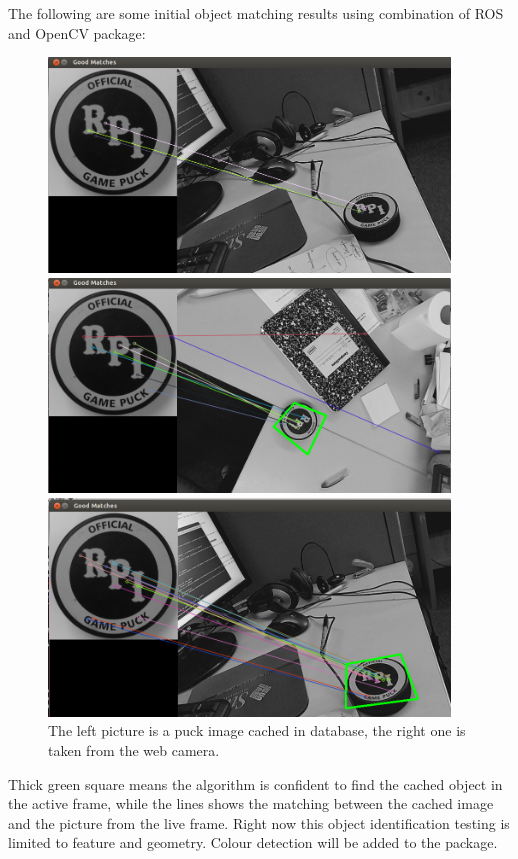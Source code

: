 \documentclass{paper}
\begin{document}
The following are some initial object matching results using combination of ROS and OpenCV package: 
\begin{figure}[htp]
\centering
\includegraphics[width=0.95\textwidth]{fig/vision1.png}  

 
\includegraphics[width=0.95\textwidth]{fig/vision2.png} 

 
\includegraphics[width=0.95\textwidth]{fig/vision3.png}
\caption{The left picture is a puck image cached in database, the right one is taken from the web camera.}
\label{fig:vision}
\end{figure}
Thick green square means the algorithm is confident to find the cached object in the active frame, while the lines shows the matching between the cached image and the picture from the live frame. Right now this object identification testing is limited to feature and geometry. Colour detection will be added to the package.
\end{document}
